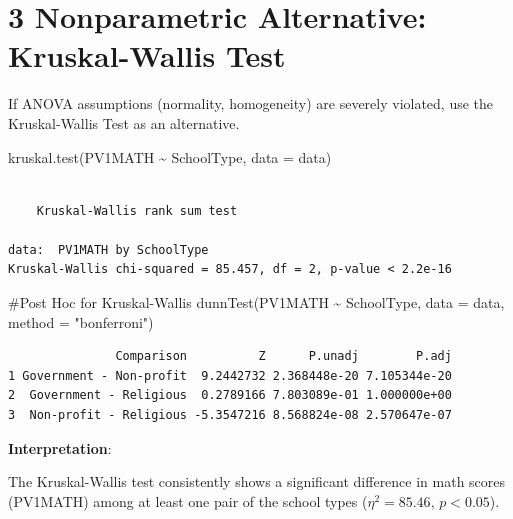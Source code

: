 \documentclass[
  letterpaper,
  DIV=11,
  numbers=noendperiod]{scrreprt}
\newenvironment{Shaded}{\begin{snugshade}}{\end{snugshade}}
\newcommand{\AttributeTok}[1]{\textcolor[rgb]{0.40,0.45,0.13}{#1}}
\newcommand{\CommentTok}[1]{\textcolor[rgb]{0.37,0.37,0.37}{#1}}
\newcommand{\FunctionTok}[1]{\textcolor[rgb]{0.28,0.35,0.67}{#1}}
\newcommand{\NormalTok}[1]{\textcolor[rgb]{0.00,0.23,0.31}{#1}}
\newcommand{\SpecialCharTok}[1]{\textcolor[rgb]{0.37,0.37,0.37}{#1}}
\newcommand{\StringTok}[1]{\textcolor[rgb]{0.13,0.47,0.30}{#1}}
\begin{document}
\section*{3 Nonparametric Alternative: Kruskal-Wallis
Test}\label{nonparametric-alternative-kruskal-wallis-test}


If ANOVA assumptions (normality, homogeneity) are severely violated, use
the Kruskal-Wallis Test as an alternative.

\begin{Shaded}
\begin{Highlighting}[]
\FunctionTok{kruskal.test}\NormalTok{(PV1MATH }\SpecialCharTok{\textasciitilde{}}\NormalTok{ SchoolType, }\AttributeTok{data =}\NormalTok{ data) }
\end{Highlighting}
\end{Shaded}

\begin{verbatim}

    Kruskal-Wallis rank sum test

data:  PV1MATH by SchoolType
Kruskal-Wallis chi-squared = 85.457, df = 2, p-value < 2.2e-16
\end{verbatim}

\begin{Shaded}
\begin{Highlighting}[]
\CommentTok{\#Post Hoc for Kruskal{-}Wallis }
\FunctionTok{dunnTest}\NormalTok{(PV1MATH }\SpecialCharTok{\textasciitilde{}}\NormalTok{ SchoolType, }\AttributeTok{data =}\NormalTok{ data, }\AttributeTok{method =} \StringTok{"bonferroni"}\NormalTok{) }
\end{Highlighting}
\end{Shaded}

\begin{verbatim}
               Comparison          Z      P.unadj        P.adj
1 Government - Non-profit  9.2442732 2.368448e-20 7.105344e-20
2  Government - Religious  0.2789166 7.803089e-01 1.000000e+00
3  Non-profit - Religious -5.3547216 8.568824e-08 2.570647e-07
\end{verbatim}

\textbf{Interpretation}:

The Kruskal-Wallis test consistently shows a significant difference in
math scores (PV1MATH) among at least one pair of the school types
(\(\eta^2 = 85.46, \, p < 0.05\)).
\end{document}

